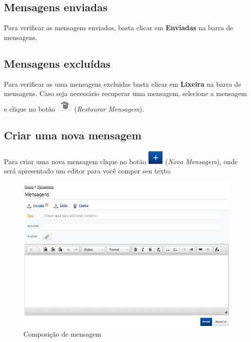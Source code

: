\documentclass[letterpaper,10pt,english]{sphinxmanual}
\begin{document}
\subsection{Mensagens enviadas}
\label{messages:mensagens-enviadas}
Para verificar as mensagens enviadas, basta clicar em \textbf{Enviadas} na barra de mensagens.


\subsection{Mensagens excluídas}
\label{messages:mensagens-excluidas}
Para verificar as uma mensagens excluidas basta clicar em \textbf{Lixeira} na barra de mensagens. Caso seja necessário recuperar uma mensagem, selecione a mensagem e clique no botão \includegraphics{messages-btn-restore.png} (\emph{Restaurar Mensagem}).


\subsection{Criar uma nova mensagem}
\label{messages:criar-uma-nova-mensagem}
Para criar uma nova mensagem clique no botão \includegraphics{messages-btn-new.png} (\emph{Nova Mensagem}), onde será apresentado um editor para você compor seu texto.
\begin{figure}[htbp]
\centering
\capstart

\includegraphics{messages-compose.png}
\caption{Composição de mensagem}\end{figure}
\end{document}
